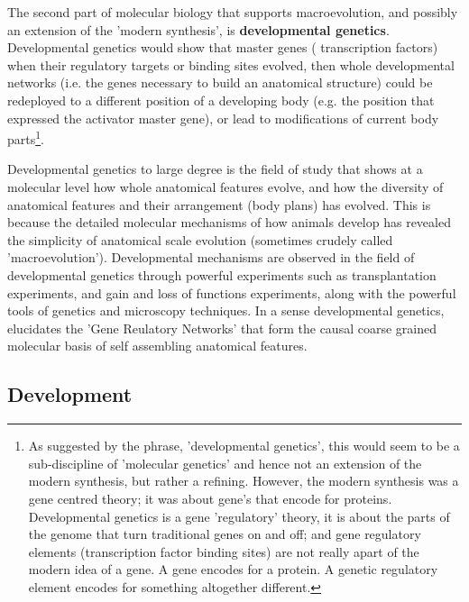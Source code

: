 The second part of molecular biology that supports macroevolution, and possibly an extension of the 'modern synthesis', is \textbf{developmental genetics}. Developmental genetics would show that master genes ( transcription factors) when their regulatory targets or binding sites evolved, then whole developmental networks (i.e. the genes necessary to build an anatomical structure) could be redeployed to a different position of a developing body (e.g. the position that expressed the activator master gene), or lead to modifications of current body parts\footnote{As suggested by the phrase, 'developmental genetics', this would seem to be a sub-discipline of 'molecular genetics' and hence not an extension of the modern synthesis, but rather a refining.  However, the modern synthesis was a gene centred theory; it was about gene's that encode for proteins.  Developmental genetics is a gene 'regulatory' theory, it is about the parts of the genome that turn traditional genes on and off; and gene regulatory elements (transcription factor binding sites) are not really apart of the modern idea of a gene.  A gene encodes for a protein.  A genetic regulatory element encodes for something altogether different.}.  

Developmental genetics to large degree is the field of study that shows at a molecular level how whole anatomical features evolve, and how the diversity of anatomical features and their arrangement (body plans) has evolved.  This is because the detailed molecular mechanisms of how animals develop has revealed the simplicity of anatomical scale evolution (sometimes crudely called 'macroevolution').  Developmental mechanisms are observed in the field of developmental genetics through powerful experiments such as transplantation experiments, and gain and loss of functions experiments, along with the powerful tools of genetics and microscopy techniques.  In a sense developmental genetics, elucidates the 'Gene Reulatory Networks' that form the causal coarse grained molecular basis of self assembling anatomical features. 
\subsection{Development}

